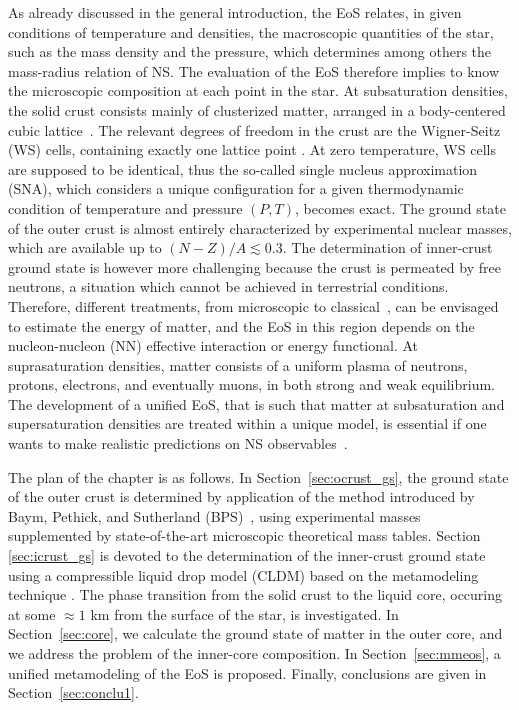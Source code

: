 As already discussed in the general introduction, the EoS 
relates, in given conditions of temperature and densities, the macroscopic
quantities of the star, such as the mass density and the pressure, which
determines among others the mass-radius relation of NS. The evaluation of the
EoS therefore implies to know the microscopic composition at each point in the
star. At subsaturation densities, the solid crust consists mainly of 
clusterized matter, arranged in a body-centered cubic lattice~\cite{Haensel2007}. 
The relevant degrees of freedom in the crust are the Wigner-Seitz (WS) 
cells, containing exactly one lattice point \cite{Wigner1933}. At zero
temperature, WS cells are supposed to be identical, thus the so-called single
nucleus approximation (SNA), which considers a unique configuration for a given 
thermodynamic condition of temperature and pressure $(P,T)$, becomes exact. The 
ground state of the outer crust is almost entirely characterized by experimental 
nuclear masses, which are available up to $(N-Z)/A \lesssim 0.3$. The 
determination of inner-crust ground state is however more challenging because 
the crust is permeated by free neutrons, a situation which cannot be achieved
in terrestrial conditions. Therefore, different treatments, from 
microscopic \cite{Negele1973} to classical~\cite{BBP}, can be envisaged to
estimate the energy of matter, and the EoS in this region depends on the 
nucleon-nucleon (NN) effective interaction or energy functional. At 
suprasaturation densities, matter consists of a uniform plasma of neutrons, 
protons, electrons, and eventually muons, in both strong and weak equilibrium. 
The development of a unified EoS, that is such that 
matter at subsaturation and supersaturation densities are treated within a
unique model, is essential if one wants to make realistic predictions on NS
observables~\cite{Fortin2016}.

The plan of the chapter is as follows. In Section~\ref{sec:ocrust_gs}, the 
ground state of the outer crust is determined by application of the 
method introduced by Baym, Pethick, and Sutherland (BPS)~\cite{BPS}, using 
experimental masses~\cite{Huang2017} supplemented by 
state-of-the-art microscopic theoretical mass tables. Section
\ref{sec:icrust_gs} is devoted to the determination of the inner-crust ground 
state using a compressible liquid drop model (CLDM) based on the metamodeling
technique \cite{Margueron2018a,Carreau2019cc}. The phase transition 
from the solid crust to the liquid core, occuring at some $\approx 1$ km from the 
surface of the star, is investigated. In Section~\ref{sec:core}, we calculate 
the ground state of matter in the outer core, and we address the problem of the 
inner-core composition. In Section~\ref{sec:mmeos}, a unified metamodeling of 
the EoS is proposed. Finally, conclusions are given in Section~\ref{sec:conclu1}.

